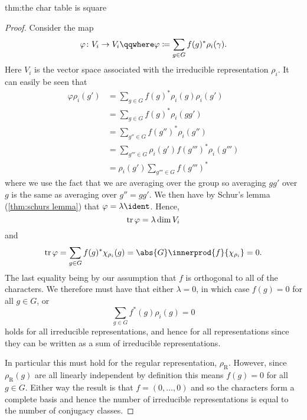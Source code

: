 \begin{thm}{}{thm:the char table is square}
\begin{proof}
        Consider the map
        \begin{equation}
            \varphi \colon V_i \to V_i \qqwhere \varphi \coloneqq \sum_{g
                \in G} f(g)^* \rho_i(\gamma).
        \end{equation}
        Here \(V_i\) is the vector space associated with the irreducible
        representation \(\rho_i\).
        It can easily be seen that
        \begin{align}
            \varphi \rho_i(g') &= \sum_{g\in G} f(g)^* \rho_i(g)\rho_i(g')\\
            &= \sum_{g\in G} f(g)^* \rho_i(gg')\\
            &= \sum_{g''\in G} f(g'')^* \rho_i(g'')\\
            &= \sum_{g'''\in G} \rho_i(g')f(g''')^*\rho_i(g''')\\
            &= \rho_i(g') \sum_{g'''\in G} f(g''')^*
        \end{align}
        where we use the fact that we are averaging over the group so
        averaging \(gg'\) over \(g\) is the same as averaging over \(g'' = gg'\).
        We then have by Schur's lemma (\cref{thm:schurs lemma}) that
        \(\varphi = \lambda\ident\).
        Hence,
        \begin{equation}
            \operatorname{tr}\varphi = \lambda\dim V_i
        \end{equation}
        and
        \begin{equation}
            \tr\varphi = \sum_{g \in G} f(g)^* \chi_{\rho_i}(g) = \abs{G}
            \innerprod{f}{\chi_{\rho_i}} = 0.
        \end{equation}
        The last equality being by our assumption that \(f\) is orthogonal
        to all of the characters.
        We therefore must have that either \(\lambda = 0\), in which case
        \(f(g) = 0\) for all \(g \in G\), or
        \begin{equation}
            \sum_{g\in G} f^*(g)\rho_i(g) = 0
        \end{equation}
        holds for all irreducible representations, and hence for all
        representations since they can be written as a sum of irreducible
        representations.
        
        In particular this must hold for the regular representation,
        \(\rho_{\mathrm{R}}\).
        However, since \(\rho_{\mathrm{R}}(g)\) are all linearly independent
        by definition this means \(f(g) = 0\) for all \(g \in G\).
        Either way the result is that \(f = (0, \dotsc, 0)\) and so the
        characters form a complete basis and hence the number of irreducible
        representations is equal to the number of conjugacy classes.
    \end{proof}
\end{thm}

